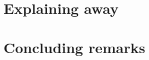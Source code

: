 \documentclass[12pt]{report}
\begin{document}
    \chapter{Explaining away}
    
    
    \chapter{Concluding remarks}
    

    \printbibliography

    
    
    \appendix
    




\end{document}
